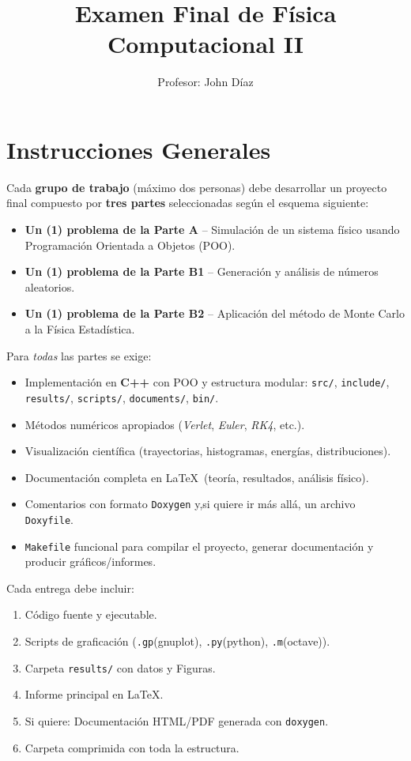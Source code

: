 \documentclass[11pt]{article}
\title{\textbf{Examen Final de Física Computacional II}}
\author{Profesor: John  Díaz }
\date{}
\begin{document}
\maketitle
\tableofcontents
\newpage

\section*{Instrucciones Generales}
Cada \textbf{grupo de trabajo} (máximo dos personas) debe desarrollar un proyecto final compuesto por \textbf{tres partes} seleccionadas según el esquema siguiente:

\begin{tcolorbox}[colback=gray!10,colframe=black!80,title=Trabajo por grupo]
\begin{itemize}
  \item \textbf{Un (1) problema de la Parte A} – Simulación de un sistema físico usando Programación Orientada a Objetos (POO).
  \item \textbf{Un (1) problema de la Parte B1} – Generación y análisis de números aleatorios.
  \item \textbf{Un (1) problema de la Parte B2} – Aplicación del método de Monte Carlo a la Física Estadística.
\end{itemize}
\end{tcolorbox}

\noindent Para \emph{todas} las partes se exige:
\begin{itemize}
  \item Implementación en \textbf{C++} con POO y estructura modular: \texttt{src/}, \texttt{include/}, \texttt{results/}, \texttt{scripts/}, \texttt{documents/}, \texttt{bin/}.
  \item Métodos numéricos apropiados (\emph{Verlet}, \emph{Euler}, \emph{RK4}, etc.).
  \item Visualización científica (trayectorias, histogramas, energías, distribuciones).
  \item Documentación completa en \LaTeX\ (teoría, resultados, análisis físico).
  \item Comentarios con formato \texttt{Doxygen} y,si quiere ir más allá, un archivo \texttt{Doxyfile}.
  \item \texttt{Makefile} funcional para compilar el proyecto, generar documentación y producir gráficos/informes.
\end{itemize}

Cada entrega debe incluir:
\begin{enumerate}[label=\alph*)]
  \item Código fuente y ejecutable.
  \item Scripts de graficación (\texttt{.gp}(gnuplot), \texttt{.py}(python), \texttt{.m}(octave)).
  \item Carpeta \texttt{results/} con datos y Figuras.
  \item Informe principal en \LaTeX.
  \item Si quiere: Documentación HTML/PDF generada con \texttt{doxygen}.
  \item Carpeta comprimida con toda la estructura.
\end{enumerate}
\end{document}
